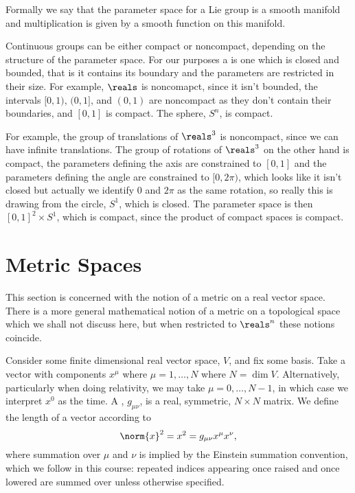 \documentclass[fleqn]{NotesClass}
\newcommand{\sphere}[1][n]{S^{#1}}
\begin{document}
    Formally we say that the parameter space for a Lie group is a smooth manifold and multiplication is given by a smooth function on this manifold.
    
    Continuous groups can be either compact or noncompact, depending on the structure of the parameter space.
    For our purposes a  is one which is closed and bounded, that is it contains its boundary and the parameters are restricted in their size.
    For example, \(\reals\) is noncomapct, since it isn't bounded, the intervals \([0, 1)\), \((0, 1]\), and \((0, 1)\) are noncompact as they don't contain their boundaries, and \([0, 1]\) is compact.
    The sphere, \(\sphere\), is compact.
    
    For example, the group of translations of \(\reals^3\) is noncompact, since we can have infinite translations.
    The group of rotations of \(\reals^3\) on the other hand is compact, the parameters defining the axis are constrained to \([0, 1]\) and the parameters defining the angle are constrained to \([0, 2\pi)\), which looks like it isn't closed but actually we identify 0 and \(2\pi\) as the same rotation, so really this is drawing from the circle, \(\sphere[1]\), which is closed.
    The parameter space is then \([0, 1]^2 \times \sphere[1]\), which is compact, since the product of compact spaces is compact.
    
    \section{Metric Spaces}
    \begin{rmk}
        This section is concerned with the notion of a metric on a real vector space.
        There is a more general mathematical notion of a metric on a topological space which we shall not discuss here, but when restricted to \(\reals^n\) these notions coincide.
    \end{rmk}

    Consider some finite dimensional real vector space, \(V\), and fix some basis.
    Take a vector with components \(x^\mu\) where \(\mu = 1, \dotsc, N\) where \(N = \dim V\).
    Alternatively, particularly when doing relativity, we may take \(\mu = 0, \dotsc, N - 1\), in which case we interpret \(x^0\) as the time.
    A , \(g_{\mu\nu}\), is a real, symmetric, \(N \times N\) matrix.
    We define the length of a vector according to
    \begin{equation}
        \norm{x}^2 = x^2 = g_{\mu\nu}x^\mu x^\nu,
    \end{equation}
    where summation over \(\mu\) and \(\nu\) is implied by the Einstein summation convention, which we follow in this course: repeated indices appearing once raised and once lowered are summed over unless otherwise specified.
    
\end{document}

